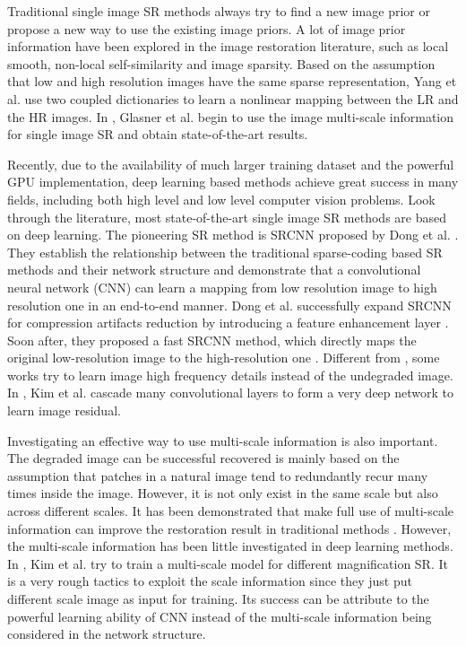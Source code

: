 \documentclass{article}
\begin{document}
Traditional single image SR methods always try to find a new image prior or propose a new way to use the existing image priors. A lot of image prior information have been explored in the image restoration literature, such as local smooth, non-local self-similarity and image sparsity. Based on the assumption that low and high resolution images have the same sparse representation, Yang et al. \cite{ref2} use two coupled dictionaries to learn a nonlinear mapping between the LR and the HR images. In \cite{ref3}, Glasner et al. begin to use the image multi-scale information for single image SR and obtain state-of-the-art results.

Recently, due to the availability of much larger training dataset and the powerful GPU implementation, deep learning based methods achieve great success in many fields, including both high level and low level computer vision problems. Look through the literature, most state-of-the-art single image SR methods are based on deep learning. The pioneering SR method is SRCNN proposed by Dong et al. \cite{ref4, ref5}. They establish the relationship between the traditional sparse-coding based SR methods and their network structure and demonstrate that a convolutional neural network (CNN) can learn a mapping from low resolution image to high resolution one in an end-to-end manner. Dong et al. successfully expand SRCNN for compression artifacts reduction by introducing a feature enhancement layer \cite{ref6}. Soon after, they proposed a fast SRCNN method, which directly maps the original low-resolution image to the high-resolution one \cite{ref7}. Different from \cite{ref4,ref5,ref6,ref7}, some works try to learn image high frequency details instead of the undegraded image. In \cite{ref9}, Kim et al. cascade many convolutional layers to form a very deep network to learn image residual.

Investigating an effective way to use multi-scale information is also important. The degraded image can be successful recovered is mainly based on the assumption that patches in a natural image tend to redundantly recur many times inside the image. However, it is not only exist in the same scale but also across different scales. It has been demonstrated that make full use of multi-scale information can improve the restoration result in traditional methods \cite{ref3}. However, the multi-scale information has been little investigated in deep learning methods. In \cite{ref9}, Kim et al. try to train a multi-scale model for different magnification SR. It is a very rough tactics to exploit the scale information since they just put different scale image as input for training. Its success can be attribute to the powerful learning ability of CNN instead of the multi-scale information being considered in the network structure.
\end{document}
